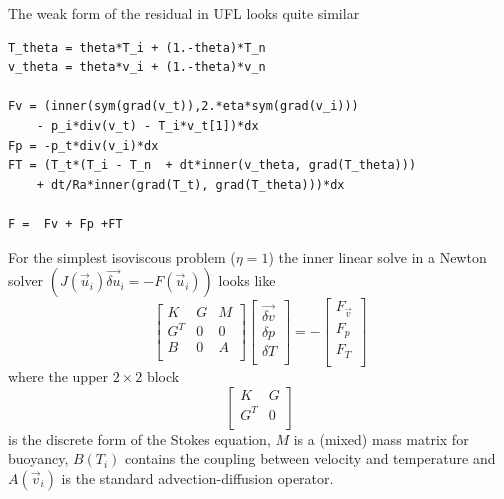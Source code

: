 The weak form of the residual in UFL looks quite similar
\begin{lstlisting}[style=UFL]
T_theta = theta*T_i + (1.-theta)*T_n
v_theta = theta*v_i + (1.-theta)*v_n 

Fv = (inner(sym(grad(v_t)),2.*eta*sym(grad(v_i)))
    - p_i*div(v_t) - T_i*v_t[1])*dx  
Fp = -p_t*div(v_i)*dx 
FT = (T_t*(T_i - T_n  + dt*inner(v_theta, grad(T_theta))) 
    + dt/Ra*inner(grad(T_t), grad(T_theta)))*dx 

F =  Fv + Fp +FT
\end{lstlisting}

For the simplest
isoviscous problem ($\eta=1$) the inner linear solve in a Newton solver
$(J\left(\vec{u}_i\right)\vec{\delta u}_i=-F\left(\vec{u}_i\right))$ looks like
\begin{equation}
  \label{eq:4.7}
  \left[
\begin{array}{ccc}
  K & G  & M \\
  G^{T} & 0 & 0 \\
  B & 0 & A \\ 
  \end{array}
  \right]
  \left[
    \begin{array}{c}
      \vec{\delta v} \\
      \delta p \\
      \delta T \\
    \end{array}
  \right] = -\left[
    \begin{array}{c}
      F_{\vec{v}}\\
      F_{p}\\
      F_{T}\\
    \end{array}
  \right]
\end{equation}
where the upper $2\times2$ block
\begin{displaymath}
     \left[
\begin{array}{cc}
  K & G  \\
  G^{T} & 0 \\
  \end{array}
  \right]
\end{displaymath}
is the discrete form of the Stokes equation, 
$M$ is a (mixed) mass matrix for buoyancy, $B(T_i)$ contains the
coupling between velocity and temperature and $A(\vec{v}_i)$ is the standard
advection-diffusion operator.  


